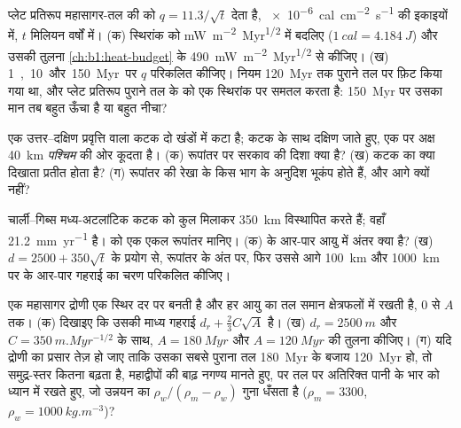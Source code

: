\begin{exercise}[$\star\star$]\label{exo:b1:rifts-ridges-margins:7}
प्लेट प्रतिरूप महासागर-तल की  को $q = 11.3/\sqrt t$ देता है, \qty{e-6}{cal.cm^{-2}.s^{-1}} की इकाइयों में, $t$ मिलियन वर्षों में। (क) स्थिरांक को \unit{mW.m^{-2}.Myr^{1/2}} में बदलिए ($\qty{1}{cal} =
\qty{4.184}{J}$) और उसकी तुलना \cref{ch:b1:heat-budget} के \qty{490}{mW.m^{-2}.Myr^{1/2}} से कीजिए। (ख) \qty{1}, \qty{10} और \qty{150}{Myr} पर $q$ परिकलित कीजिए। नियम \qty{120}{Myr} तक पुराने तल पर फ़िट किया गया था, और प्लेट प्रतिरूप पुराने तल के  को एक स्थिरांक पर समतल करता है: \qty{150}{Myr} पर उसका मान तब बहुत ऊँचा है या बहुत नीचा?
\end{exercise}

\begin{exercise}[$\star\star$]\label{exo:b1:rifts-ridges-margins:8}
एक उत्तर–दक्षिण प्रवृत्ति वाला कटक दो खंडों में कटा है; कटक के साथ दक्षिण जाते हुए, एक  पर अक्ष \qty{40}{km} \emph{पश्चिम} की ओर कूदता है। (क) रूपांतर पर सरकाव की दिशा क्या है? (ख) कटक का  क्या दिखाता प्रतीत होता है? (ग) रूपांतर की रेखा के किस भाग के अनुदिश भूकंप होते हैं, और आगे क्यों नहीं?
\end{exercise}

\begin{exercise}[$\star\star$]\label{exo:b1:rifts-ridges-margins:9}
चार्ली–गिब्स  मध्य-अटलांटिक कटक को कुल मिलाकर \qty{350}{km} विस्थापित करते हैं; वहाँ  \qty{21.2}{mm.yr^{-1}} है।  को एक एकल रूपांतर मानिए। (क)  के आर-पार आयु में अंतर क्या है? (ख) $d = 2500 + 350\sqrt t$ के प्रयोग से, रूपांतर के अंत पर, फिर उससे आगे \qty{100}{km} और \qty{1000}{km} पर  के आर-पार गहराई का चरण परिकलित कीजिए।
\end{exercise}

\begin{exercise}[$\star\star\star$]\label{exo:b1:rifts-ridges-margins:10}
एक महासागर द्रोणी एक स्थिर दर पर बनती है और हर आयु का तल समान क्षेत्रफलों में रखती है, 0 से $A$ तक। (क) दिखाइए कि उसकी माध्य गहराई $d_r +
\frac23C\sqrt A$ है। (ख) $d_r = \qty{2500}{m}$ और $C = \qty{350}{m.Myr^{-1/2}}$ के साथ, $A = \qty{180}{Myr}$ और
$A = \qty{120}{Myr}$ की तुलना कीजिए। (ग) यदि द्रोणी का प्रसार तेज़ हो जाए ताकि उसका सबसे पुराना तल \qty{180}{Myr} के बजाय \qty{120}{Myr} हो, तो समुद्र-स्तर कितना बढ़ता है, महाद्वीपों की बाढ़ नगण्य मानते हुए, पर तल पर अतिरिक्त पानी के भार को ध्यान में रखते हुए, जो उन्नयन का $\rho_w/(\rho_m - \rho_w)$ गुना धँसता है ($\rho_m = 3300$, $\rho_w = \qty{1000}{kg.m^{-3}}$)?
\end{exercise}


